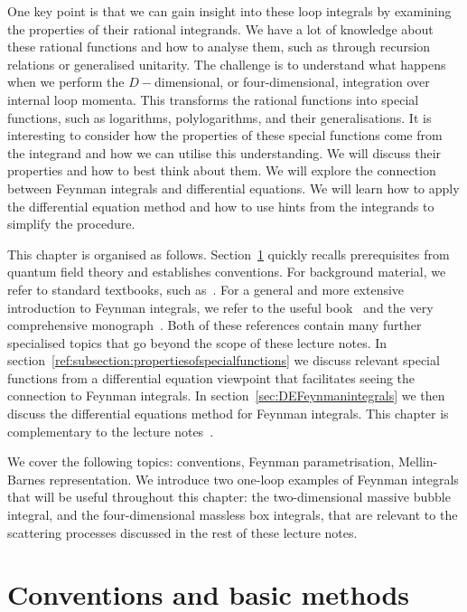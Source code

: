 One key point is that we can gain insight into these loop integrals by examining the properties of their rational integrands. We have a lot of knowledge about these rational functions and how to analyse them, such as through recursion relations or generalised unitarity.
The challenge is to understand what happens when we perform the $D-$dimensional, or four-dimensional, integration over internal loop momenta. This transforms the rational functions into special functions, such as logarithms, polylogarithms, and their generalisations.
It is interesting to consider how the properties of these special functions come from the integrand and how we can utilise this understanding. 
We will discuss their properties and how to best think about them.
We will explore the connection between Feynman integrals and differential equations. We will learn how to apply the differential equation method and how to use hints from the integrands to simplify the procedure. 

This chapter is organised as follows. Section~\ref{sec:introduction} quickly recalls prerequisites from quantum field theory and establishes conventions. For background material, we refer to standard textbooks, such as~\cite{ch4Peskin:1995ev}. 
For a general and more extensive introduction to Feynman integrals, we refer to the useful book~\cite{ch4Smirnov:2012gma} and the very comprehensive monograph~\cite{ch4Weinzierl:2022eaz}. Both of these references contain many further specialised topics that go beyond the scope of these lecture notes.
In section~\ref{ref:subsection:propertiesofspecialfunctions} we discuss relevant special functions from a differential equation viewpoint that facilitates seeing the connection to Feynman integrals.
In section~\ref{sec:DEFeynmanintegrals} we then discuss the differential equations method for Feynman integrals.
This chapter is complementary to the lecture notes~\cite{ch4Henn:2014qga}. 


 We cover the following topics: conventions, Feynman parametrisation, Mellin-Barnes representation.
 We introduce two one-loop examples of Feynman integrals that will be useful throughout this chapter: the two-dimensional massive bubble integral, and the four-dimensional massless box integrals, that are relevant to the scattering processes discussed in the rest of these lecture notes.
 


 \section{Conventions and basic methods} 
\label{sec:introduction}

